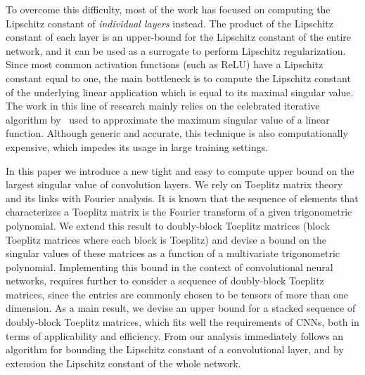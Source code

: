 To overcome this difficulty, most of the work has focused on computing the Lipschitz constant of {\em individual layers} instead.
The product of the Lipschitz constant of each layer is an upper-bound for the Lipschitz constant of the entire network, and it can be used as a surrogate to perform Lipschitz regularization.
Since most common activation functions (such as ReLU) have a Lipschitz constant equal to one, the main bottleneck is to compute the Lipschitz constant of the underlying linear application which is equal to its maximal singular value.
The work in this line of research mainly relies on the celebrated iterative algorithm by~\cite{golub2000eigenvalue} used to approximate the maximum singular value of a linear function.
Although generic and accurate, this technique is also computationally expensive, which impedes its usage in large training settings. 

In this paper we introduce a new tight and easy to compute  upper bound on the largest singular value of convolution layers.
We rely on Toeplitz matrix theory and its links with Fourier analysis.
It is known that the sequence of elements that characterizes a Toeplitz matrix is the Fourier transform of a given trigonometric polynomial.
We extend this result to doubly-block Toeplitz matrices (\ie block Toeplitz matrices where each block is Toeplitz) and devise a bound on the singular values of these matrices as a function of a multivariate trigonometric polynomial.
Implementing this bound in the context of convolutional neural networks, requires further to consider a sequence of doubly-block Toeplitz matrices, since the entries are commonly chosen to be tensors of more than one dimension.
As a main result, we devise an upper bound for a stacked sequence of doubly-block Toeplitz matrices, which fits well the requirements of CNNs, both in terms of applicability and efficiency.
From our analysis immediately follows an algorithm for bounding the Lipschitz constant of a convolutional layer, and by extension the Lipschitz constant of the whole network. 

